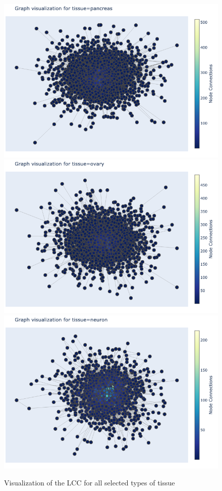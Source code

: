 \documentclass[paper=a4,fontsize=11pt,DIV=8,BCOR=5mm,oneside,pdftex,bibtotocnumbered]{scrreprt}
\theoremstyle{plain}
\begin{document}
	 \begin{figure}
		\centering
		\caption{Visualization of the LCC for all selected types of tissue}
		\includegraphics[scale=0.4]{graph_tissue=pancreas.png}
		\includegraphics[scale=0.4]{graph_tissue=ovary.png}
		\includegraphics[scale=0.4]{graph_tissue=neuron.png}
		\label{fig:LCC_visual}
	\end{figure}
	
\end{document}
